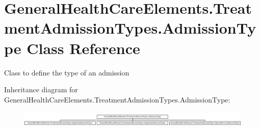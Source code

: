 \hypertarget{class_general_health_care_elements_1_1_treatment_admission_types_1_1_admission_type}{}\section{General\+Health\+Care\+Elements.\+Treatment\+Admission\+Types.\+Admission\+Type Class Reference}
\label{class_general_health_care_elements_1_1_treatment_admission_types_1_1_admission_type}


Class to define the type of an admission  


Inheritance diagram for General\+Health\+Care\+Elements.\+Treatment\+Admission\+Types.\+Admission\+Type\+:\begin{figure}[H]
\begin{center}
\leavevmode
\includegraphics[height=0.732026cm]{class_general_health_care_elements_1_1_treatment_admission_types_1_1_admission_type}
\end{center}
\end{figure}
